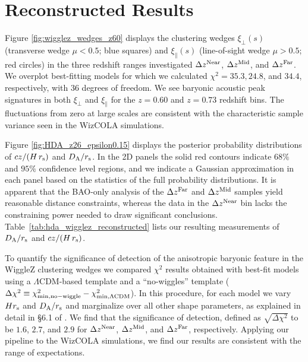 \documentclass[a4paper,fleqn,usenatbib]{mnras}
\begin{document}
\section{Reconstructed Results}\label{sec:wedge}

Figure \ref{fig:wigglez_wedges_z60} displays the clustering wedges
$\xi_\perp(s)$ (transverse wedge $\mu<0.5$; blue squares) and
$\xi_\parallel(s)$ (line-of-sight wedge $\mu>0.5$; red circles) in the
three redshift ranges investigated $\Delta z^{\rm Near}$, $\Delta
z^{\rm Mid}$, and $\Delta z^{\rm Far}$.  We overplot best-fitting
models for which we calculated $\chi^2 = 35.3, 24.8$, and $34.4$,
respectively, with 36 degrees of freedom.  We see baryonic acoustic
peak signatures in both $\xi_\perp$ and $\xi_\parallel$ for the $z=0.60$ and
$z=0.73$ redshift bins.  The fluctuations from zero at large scales are
consistent with the characteristic sample variance seen in the WizCOLA
simulations.

Figure \ref{fig:HDA_z26_epsilon0.15} displays the posterior
probability distributions of $cz/(H \,r_{\rm s})$ and $D_{\rm A}/r_{\rm
  s}$. In the 2D panels the solid red contours indicate $68\%$ and
$95\%$ confidence level regions, and we indicate a Gaussian
approximation in each panel based on the statistics of the full
probability distributions.  It is apparent that the BAO-only analysis
of the $\Delta z^{\rm Far}$ and $\Delta z^{\rm Mid}$ samples yield
reasonable distance constraints, whereas the data in the $\Delta
z^{\rm Near}$ bin lacks the constraining power needed to draw
significant conclusions.  Table~\ref{tab:hda_wigglez_reconstructed} lists our resulting measurements of
$D_{\rm A}/r_{\rm s}$ and $cz/(H \, r_{\rm s})$.

To quantify the significance of detection of the anisotropic baryonic
feature in the WiggleZ clustering wedges we compared $\chi^2$ results
obtained with best-fit models using a $\Lambda$CDM-based template and
a ``no-wiggles'' template ($\Delta\chi^2 \equiv \chi^2_{\rm min,
  no-wiggle} - \chi^2_{\rm min, \Lambda CDM}$).  In this procedure,
for each model we vary $H r_{\rm s}$ and $D_{\rm A}/r_{\rm s}$ and
marginalize over all other shape parameters, as explained in detail in
\S 6.1 of \citet{KazinSanchezCuesta2013}.  We find that the significance of
detection, defined as $\sqrt{\Delta\chi^2}$ to be $1.6$, $2.7$, and
$2.9$ for $\Delta z^{\rm Near}$, $\Delta z^{\rm Mid}$, and $\Delta
z^{\rm Far}$, respectively.  Applying our pipeline to the WizCOLA
simulations, we find our results are consistent with the range of
expectations.
\end{document}
